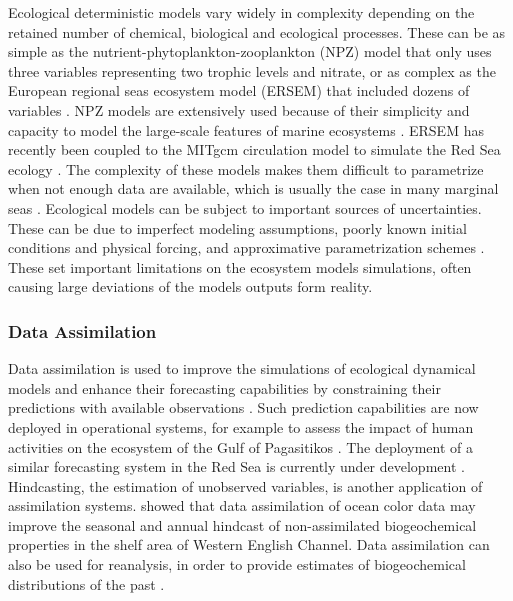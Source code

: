 Ecological deterministic models vary widely in complexity depending on the
retained number of chemical, biological and ecological processes. These can
be as simple as the nutrient-phytoplankton-zooplankton (NPZ) model
\citep{Anderson2005} that only uses three variables representing two trophic
levels and nitrate, or as complex as the European regional seas ecosystem model
(ERSEM) that included dozens of variables \citep{Baretta1995}. NPZ models are
extensively used because of their simplicity and capacity to model the
large-scale features of marine ecosystems \citep{Anderson2005}. ERSEM has
recently been coupled to the MITgcm circulation model to simulate the Red Sea
ecology \citep{Triantafyllou2014}.  The complexity of these models makes them
difficult to parametrize when not enough data are available, which is usually
the case in many marginal seas \citep{Anderson2005}. Ecological models can be
subject to important sources of uncertainties. These can be due to imperfect
modeling assumptions, poorly known initial conditions and physical forcing, and
approximative parametrization schemes \citep{Edwards2015}.  These set important
limitations on the ecosystem models simulations, often causing large deviations
of the models outputs form reality.

\subsubsection{Data Assimilation}

Data assimilation is used to improve the simulations of ecological dynamical
models and enhance their forecasting capabilities by constraining their
predictions with available observations \citep{Edwards2015}. Such prediction
capabilities are now deployed in operational systems, for example to assess
the impact of human activities on the ecosystem of the Gulf of Pagasitikos
\citep{Korres2012}. The deployment of a similar forecasting system in the Red
Sea is currently under development \citep{Triantafyllou2014}. Hindcasting, the
estimation of unobserved variables, is another application of assimilation
systems. \citet{Ciavatta2011} showed that data assimilation of ocean color data
may improve the seasonal and annual hindcast of non-assimilated biogeochemical
properties in the shelf area of Western English Channel. Data assimilation can
also be used for reanalysis, in order to provide estimates of biogeochemical
distributions of the past \citep{Fontana2013}.

